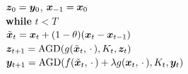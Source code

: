 \documentclass{article}
\begin{document}


\begin{algorithm*}[t]  
\caption{AccF${}^2$BA${}^+$} \label{alg:AccF2BA}
\begin{algorithmic}[1] 
\STATE $ {\bm{z}}_0 = {\bm{y}}_0$, ${\bm{x}}_{-1} = {\bm{x}}_0$ \\[1mm]
\STATE \textbf{while} $ t < T $ \\[1mm]
\STATE \quad $\tilde {{\bm{x}}}_{t} = {\bm{x}}_t + (1-\theta) ({\bm{x}}_t -{\bm{x}}_{t-1})$ \\[1mm]
\STATE \quad ${\bm{z}}_{t+1} = \text{AGD}( g(\tilde {{\bm{x}}}_t,\,\cdot\,), K_t, {\bm{z}}_t)$ \\[1mm]
\STATE \quad ${\bm{y}}_{t+1} = \text{AGD} (f(\tilde {{\bm{x}}}_t,\,\cdot\,) + \lambda g({\bm{x}}_t, \,\cdot\,) , K_t, {\bm{y}}_t    )$ \\[1mm]

\end{algorithmic}
\end{algorithm*}
\end{document}
